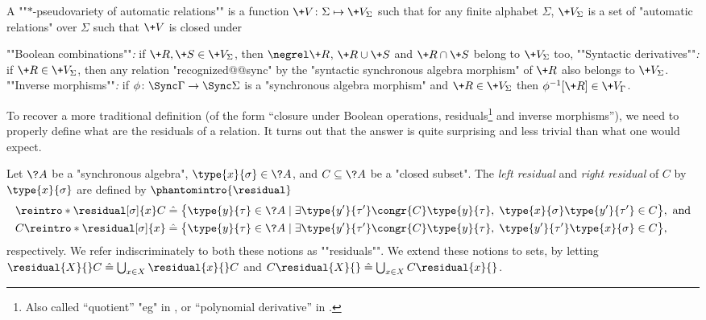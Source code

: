 A \AP""$\ast$-pseudovariety of automatic relations"" is a function $\+V \colon \Sigma \mapsto \+V_\Sigma$
such that for any finite alphabet $\Sigma$, $\+V_\Sigma$ is a set of "automatic relations" over 
$\Sigma$ such that $\+V$ is closed under
\begin{itemize}
	\itemAP ""Boolean combinations""\emph{:} if $\+R, \+S \in \+V_{\Sigma}$, then
		$\negrel\+R$, $\+R \cup \+S$ and $\+R \cap \+S$ belong to $\+V_{\Sigma}$ too,
	\itemAP ""Syntactic derivatives""\emph{:} if $\+R \in \+V_{\Sigma}$, then any relation
	"recognized@@sync" by the "syntactic synchronous algebra morphism" of $\+R$ also belongs
	to $\+V_{\Sigma}$.
	\itemAP ""Inverse morphisms""\emph{:} if $\phi\colon \Sync\Gamma \to \Sync\Sigma$ is
		a "synchronous algebra morphism" and $\+R \in \+V_{\Sigma}$ then
		$\phi^{-1}[\+R] \in \+V_{\Gamma}$. 
\end{itemize}

To recover a more traditional definition (of the form ``closure under Boolean operations, residuals\footnote{Also called ``quotient'' "eg" in \cite[\S~III.1.3, p.~39]{Pin2022MathematicalFoundations}, or ``polynomial derivative'' in \cite[\S~4, p.~19]{Bojanczyk2015Recognisable}.} and inverse morphisms''), we need to properly define what are the residuals of a relation. It 
turns out that the answer is quite surprising and less trivial than what one would expect.

\begin{definition}[Residuals]
	\AP\label{def:residuals}
	Let $\?A$ be a "synchronous algebra", $\type{x}{\sigma} \in \?A$,
	and $C \subseteq \?A$ be a "closed subset".
	The \emph{left residual} and \emph{right residual} of $C$ by $\type{x}{\sigma}$ are defined by
	$\phantomintro{\residual}$
	\begin{align*}
		\reintro*\residual[\sigma]{x} C & \defeq
		\bigl\{
			\type{y}{\tau} \in \?A \mid
				\exists \type{y'}{\tau'} \congr{C} \type{y}{\tau},\;
				\type{x}{\sigma} \type{y'}{\tau'} \in C
		\bigr\}, \text{ and} \\
		C\reintro*\residual[\sigma]{x} & \defeq
		\bigl\{
			\type{y}{\tau} \in \?A \mid
				\exists \type{y'}{\tau'} \congr{C} \type{y}{\tau},\;
				\type{y'}{\tau'}\type{x}{\sigma} \in C
		\bigr\},
	\end{align*}
	respectively. We refer indiscriminately to both these notions as \AP""residuals"".
	We extend these notions to sets, by letting
	$\residual{X}{}C \defeq \bigcup_{x\in X}\residual{x}{}C$
	and $C\residual{X}{} \defeq \bigcup_{x\in X} C\residual{x}{}$.
\end{definition}

